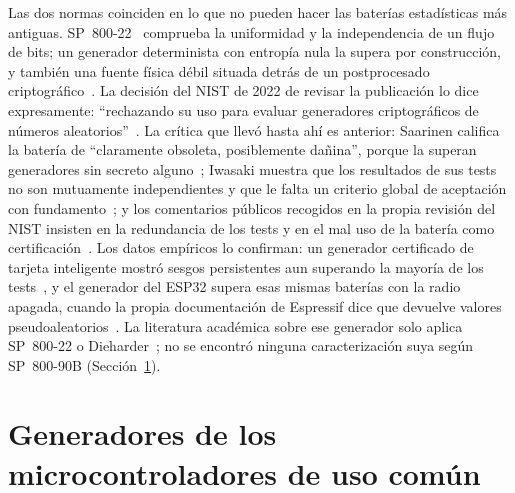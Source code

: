 Las dos normas coinciden en lo que no pueden hacer las baterías
estadísticas más antiguas. SP~800-22~\cite{bassham_2010_sp80022}
comprueba la uniformidad y la independencia de un flujo de bits; un
generador determinista con entropía nula la supera por construcción, y
también una fuente física débil situada detrás de un postprocesado
criptográfico~\cite{saarinen_2021_entropy}. La decisión del NIST de 2022
de revisar la publicación lo dice expresamente: ``rechazando su uso para
evaluar generadores criptográficos de números aleatorios''~\cite{nist_2022_decision}.
La crítica que llevó hasta ahí es anterior: Saarinen califica la batería
de ``claramente obsoleta, posiblemente dañina'', porque la superan
generadores sin secreto alguno~\cite{saarinen_2022_obsolete}; Iwasaki
muestra que los resultados de sus tests no son mutuamente independientes
y que le falta un criterio global de aceptación con
fundamento~\cite{iwasaki_2017_analysis}; y los comentarios públicos
recogidos en la propia revisión del NIST insisten en la redundancia de
los tests y en el mal uso de la batería como
certificación~\cite{nist_2021_sp80022_comments}.
Los datos empíricos lo confirman: un generador certificado de tarjeta
inteligente mostró sesgos persistentes aun superando la mayoría de los
tests~\cite{hurleysmith_2018_certifiably,
hurleysmith_2018_great}, y el generador del ESP32 supera esas mismas
baterías con la radio apagada, cuando la propia documentación de
Espressif dice que devuelve valores pseudoaleatorios~\cite{espressif_idf_random, espressif_trm_esp32,
blancoromero_2026_entropy}. La literatura académica sobre ese generador
solo aplica SP~800-22 o Dieharder~\cite{castillo_2026_automated,
hidayatulloh_2024_performance}; no se encontró ninguna caracterización
suya según SP~800-90B (Sección~\ref{sec:soa_mcu}).

\section{Generadores de los microcontroladores de uso común}
\label{sec:soa_mcu}

